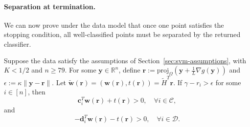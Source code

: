 \documentclass[twoside,11pt]{article}
\newcommand\proj{\mathrm{proj}}
\renewcommand{\c}{\bm{c}}
\renewcommand{\d}{\bm{d}}
\newcommand{\R}{{\mathbb{R}}} %
\renewcommand\r{\bm{r}}
\newcommand\w{\bm{w}}
\newcommand\y{\bm{y}}
\newcommand\CC{\mathcal{C}}
\newcommand\DD{\mathcal{D}}
\newcommand\tw{\tilde{\w}}
\newcommand\tH{\tilde{H}}
\begin{document}
    \paragraph{Separation at termination.}
    We can now prove under the data model that once one point satisfies the stopping condition, all well-classified points must be separated by the returned classifier.
    \begin{theorem} \label{thm:termination-correctness}
        Suppose the data satisfy the assumptions of Section~\ref{sec:svm-assumptions}, with $K<1/2$ and $n \geq 79$. For some $\y \in \R^n$, define $\r := \proj_{\Omega}(\y + \frac{1}{L}\nabla g(\y))$ and $\epsilon := \kappa\|\y - \r\|$. Let $\tw(\r) = (\w(\r),t(\r)) = \tH^T\r$. If $\gamma - r_i > \epsilon$ for some $i \in [n]$, then
        \[
            \c_i^T\w(\r) + t(\r) > 0,\quad \forall i \in \CC,
        \]
        and
        \[
            -\d_i^T\w(\r) - t(\r) > 0,\quad \forall i \in \DD.
        \]
    \end{theorem}
\end{document}
